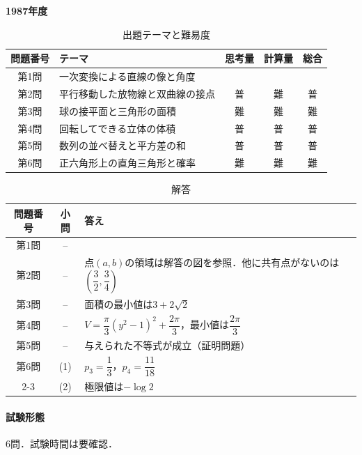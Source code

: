 \documentclass[../../main.tex]{subfiles}
\begin{document}
\begin{center}
  {\fontsize{48pt}{58pt}\selectfont \textbf{1987}\normalsize\textbf{年度}}
\end{center}

\begin{table}[htb]
  \centering
  \caption{出題テーマと難易度}
  \begin{tabular}{|c|p{6.2cm}|c|c|c|}
    \hline
    \textbf{問題番号} & \textbf{テーマ} & \textbf{思考量} & \textbf{計算量} & \textbf{総合} \\
    \hline
    第1問 & 一次変換による直線の像と角度 &  &  &  \\
    \hline
    第2問 & 平行移動した放物線と双曲線の接点 & 普 & 難 & 普 \\
    \hline
    第3問 & 球の接平面と三角形の面積 & 難 & 難 & 難 \\
    \hline
    第4問 & 回転してできる立体の体積 & 普 & 普 & 普 \\
    \hline
    第5問 & 数列の並べ替えと平方差の和 & 普 & 普 & 普 \\
    \hline
    第6問 & 正六角形上の直角三角形と確率 & 難 & 難 & 難 \\
    \hline
  \end{tabular}
\end{table}

\begin{table}[htb]
  \centering
  \caption{解答}
  \renewcommand{\arraystretch}{1.4}
  \begin{tabular}{|c|c|p{9cm}|}
    \hline
    \textbf{問題番号} & \textbf{小問} & \textbf{答え} \\
    \hline
    第1問 & -- & \\
    \hline
    第2問 & -- & 点$(a,b)$の領域は解答の図を参照．他に共有点がないのは$\left(\dfrac{3}{2},\dfrac{3}{4}\right)$ \\
    \hline
    第3問 & -- & 面積の最小値は$3+2\sqrt{2}$ \\
    \hline
    第4問 & -- & $V=\dfrac{\pi}{3}(y^2-1)^2+\dfrac{2\pi}{3}$，最小値は$\dfrac{2\pi}{3}$ \\
    \hline
    第5問 & -- & 与えられた不等式が成立（証明問題） \\
    \hline
    第6問 & (1) & $p_3=\dfrac{1}{3}$，$p_4=\dfrac{11}{18}$ \\
    \cline{2-3}
    & (2) & 極限値は$-\log 2$ \\
    \hline
  \end{tabular}
\end{table}

\paragraph{試験形態}
6問．試験時間は要確認．
\end{document}

